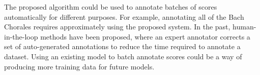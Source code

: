 
The proposed algorithm could be used to annotate batches of
scores automatically for different purposes. For example,
annotating all of the Bach Chorales requires approximately
 using the proposed system.
In the past, human-in-the-loop methods have been proposed,
where an expert annotator corrects a set of auto-generated
annotations to reduce the time required to annotate a
dataset. Using an existing model to batch annotate scores
could be a way of producing more training data for future
models.
